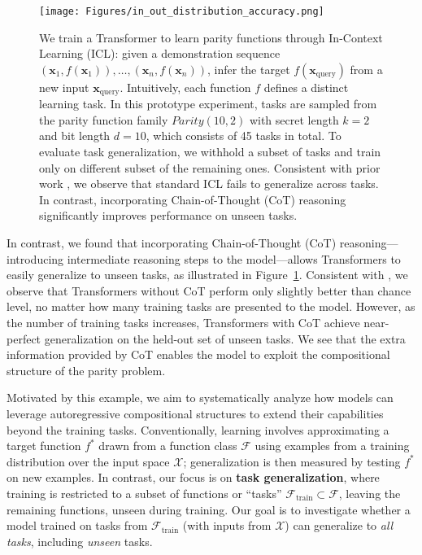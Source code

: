 \begin{figure}
    \centering
    \texttt{[image: Figures/in\_out\_distribution\_accuracy.png]}
    \caption{We train a Transformer to learn parity functions through In-Context Learning (ICL): given a demonstration sequence \((\bm x_1, f(\bm x_1)), \dots, (\bm x_n, f(\bm x_n))\), infer the target \( f(\bm x_{\mathrm{query}}) \) from a new input $\bm x_{\mathrm{query}}$. Intuitively, each function \( f \) defines a distinct learning task. In this prototype experiment, tasks are sampled from the parity function family \(Parity (10,2)\) with secret length $k=2$ and bit length $d=10$, which consists of 45 tasks in total. To evaluate task generalization, we withhold a subset of tasks and train only on different subset of the remaining ones. Consistent with prior work \cite{bhattamishra2024understanding}, we observe that standard ICL fails to generalize across tasks. In contrast, incorporating Chain-of-Thought (CoT) reasoning significantly improves performance on unseen tasks.}
    \label{fig:in_out_dist_prelim}
\end{figure}    

In contrast, we found that incorporating Chain-of-Thought (CoT) reasoning—introducing intermediate reasoning steps to the model—allows Transformers to easily generalize to unseen tasks, as illustrated in Figure~\ref{fig:in_out_dist_prelim}. Consistent with \cite{bhattamishra2024understanding}, we observe that Transformers without CoT perform only slightly better than chance level, no matter how many training tasks are presented to the model. However, as the number of training tasks increases, Transformers with CoT achieve near-perfect generalization on the held-out set of unseen tasks. We see that the extra information provided by CoT enables the model to exploit the compositional structure of the parity problem.
















Motivated by this example, we aim to systematically analyze how models can leverage autoregressive compositional structures to extend their capabilities beyond the training tasks. Conventionally, learning involves approximating a target function \(f^*\) drawn from a function class \(\mathcal{F}\) using examples from a training distribution over the input space \(\mathcal{X}\); generalization is then measured by testing $f^*$ on new  examples. In contrast, our focus is on \textbf{task generalization}, where training is restricted to a subset of functions or ``tasks'' \( \mathcal{F}_{\mathrm{train}} \subset \mathcal{F} \), leaving the remaining functions, unseen during training. Our goal is to investigate whether a model trained on tasks from \( \mathcal{F}_{\mathrm{train}} \) (with inputs from \( \mathcal{X} \)) can generalize to \textit{all tasks}, including \textit{unseen} tasks. 


